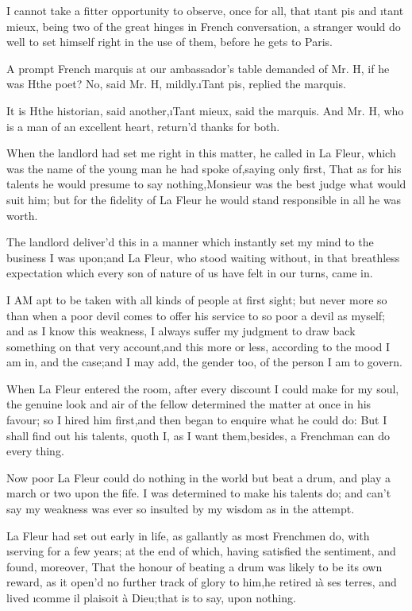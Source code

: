 \documentclass[twoside]{article}
\begin{document}
I cannot take a fitter opportunity to observe, once for all, that \i{tant
pis} and \i{tant mieux}, being two of the great hinges in French
conversation, a stranger would do well to set himself right in the use of
them, before he gets to Paris.

A prompt French marquis at our ambassador’s table demanded of Mr. H\tsk , if
he was H\tsk  the poet?  No, said Mr. H\tsk , mildly.\tsk \i{Tant pis}, replied the
marquis.

It is H\tsk  the historian, said another,\tsk \i{Tant mieux}, said the marquis.
And Mr. H\tsk , who is a man of an excellent heart, return’d thanks for both.

When the landlord had set me right in this matter, he called in La Fleur,
which was the name of the young man he had spoke of,\tsk saying only first,
That as for his talents he would presume to say nothing,\tsk Monsieur was the
best judge what would suit him; but for the fidelity of La Fleur he would
stand responsible in all he was worth.

The landlord deliver’d this in a manner which instantly set my mind to
the business I was upon;\tsk and La Fleur, who stood waiting without, in that
breathless expectation which every son of nature of us have felt in our
turns, came in.






I AM apt to be taken with all kinds of people at first sight; but never
more so than when a poor devil comes to offer his service to so poor a
devil as myself; and as I know this weakness, I always suffer my judgment
to draw back something on that very account,\tsk and this more or less,
according to the mood I am in, and the case;\tsk and I may add, the gender
too, of the person I am to govern.

When La Fleur entered the room, after every discount I could make for my
soul, the genuine look and air of the fellow determined the matter at
once in his favour; so I hired him first,\tsk and then began to enquire what
he could do: But I shall find out his talents, quoth I, as I want
them,\tsk besides, a Frenchman can do every thing.

Now poor La Fleur could do nothing in the world but beat a drum, and play
a march or two upon the fife.  I was determined to make his talents do;
and can’t say my weakness was ever so insulted by my wisdom as in the
attempt.

La Fleur had set out early in life, as gallantly as most Frenchmen do,
with \i{serving} for a few years; at the end of which, having satisfied the
sentiment, and found, moreover, That the honour of beating a drum was
likely to be its own reward, as it open’d no further track of glory to
him,\tsk he retired \i{à ses terres}, and lived \i{comme il plaisoit à
Dieu};\tsk that is to say, upon nothing.
\end{document}
